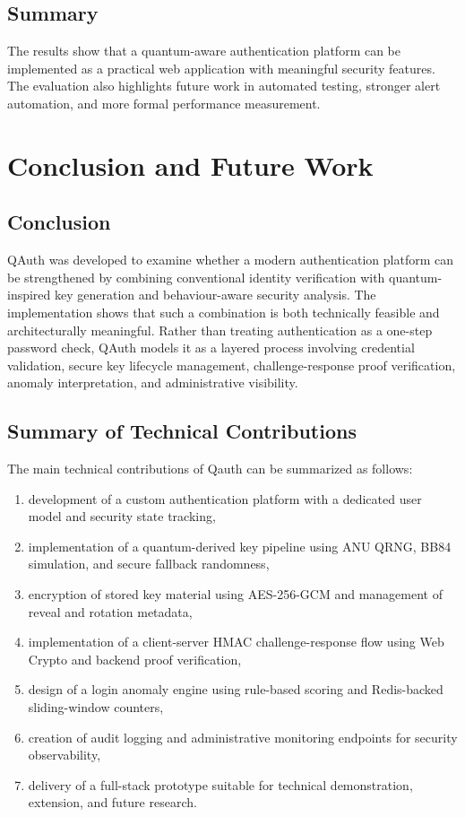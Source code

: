 \documentclass[12pt,a4paper]{report}
\begin{document}
\section{Summary}
The results show that a quantum-aware authentication platform can be implemented as a practical web application with meaningful security features. The evaluation also highlights future work in automated testing, stronger alert automation, and more formal performance measurement.


\chapter{Conclusion and Future Work}

\section{Conclusion}
QAuth was developed to examine whether a modern authentication platform can be strengthened by combining conventional identity verification with quantum-inspired key generation and behaviour-aware security analysis. The implementation shows that such a combination is both technically feasible and architecturally meaningful. Rather than treating authentication as a one-step password check, QAuth models it as a layered process involving credential validation, secure key lifecycle management, challenge-response proof verification, anomaly interpretation, and administrative visibility.

\section{Summary of Technical Contributions}
The main technical contributions of Qauth can be summarized as follows:

\begin{enumerate}
    \item development of a custom authentication platform with a dedicated user model and security state tracking,
    \item implementation of a quantum-derived key pipeline using ANU QRNG, BB84 simulation, and secure fallback randomness,
    \item encryption of stored key material using AES-256-GCM and management of reveal and rotation metadata,
    \item implementation of a client-server HMAC challenge-response flow using Web Crypto and backend proof verification,
    \item design of a login anomaly engine using rule-based scoring and Redis-backed sliding-window counters,
    \item creation of audit logging and administrative monitoring endpoints for security observability,
    \item delivery of a full-stack prototype suitable for technical demonstration, extension, and future research.
\end{enumerate}
\end{document}
